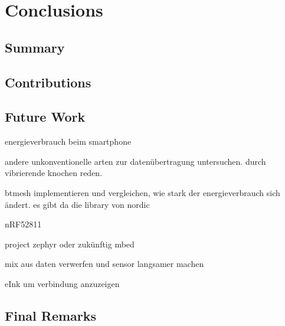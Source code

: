 \chapter{Conclusions}
\label{ch:closure}

\section{Summary}

\section{Contributions}

\section{Future Work}
energieverbrauch beim smartphone

andere unkonventionelle arten zur datenübertragung untersuchen. durch vibrierende knochen reden.

btmesh implementieren und vergleichen, wie stark der energieverbrauch sich ändert. es gibt da die library von nordic

nRF52811

project zephyr oder zukünftig mbed

mix aus daten verwerfen und sensor langsamer machen

eInk um verbindung anzuzeigen
\section{Final Remarks}

